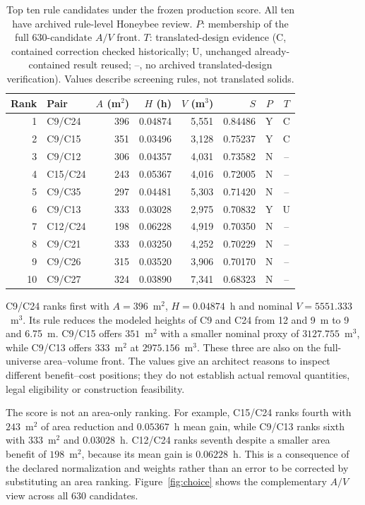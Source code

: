 \documentclass{llncs}
\begin{document}
\begin{table}[tbp]
\caption{Top ten rule candidates under the frozen production score. All ten have archived rule-level Honeybee review. $P$: membership of the full 630-candidate $A/V$ front. $T$: translated-design evidence (C, contained correction checked historically; U, unchanged already-contained result reused; --, no archived translated-design verification). Values describe screening rules, not translated solids.}
\label{tab:topten}\centering\small
\setlength{\tabcolsep}{3.2pt}
\begin{tabular}{rlrrrrcc}\toprule
Rank & Pair & $A$ (m$^2$) & $H$ (h) & $V$ (m$^3$) & $S$ & $P$ & $T$\\\midrule
1 & C9/C24 & 396 & 0.04874 & 5,551 & 0.84486 & Y & C\\
2 & C9/C15 & 351 & 0.03496 & 3,128 & 0.75237 & Y & C\\
3 & C9/C12 & 306 & 0.04357 & 4,031 & 0.73582 & N & --\\
4 & C15/C24 & 243 & 0.05367 & 4,016 & 0.72005 & N & --\\
5 & C9/C35 & 297 & 0.04481 & 5,303 & 0.71420 & N & --\\
6 & C9/C13 & 333 & 0.03028 & 2,975 & 0.70832 & Y & U\\
7 & C12/C24 & 198 & 0.06228 & 4,919 & 0.70350 & N & --\\
8 & C9/C21 & 333 & 0.03250 & 4,252 & 0.70229 & N & --\\
9 & C9/C26 & 315 & 0.03520 & 3,906 & 0.70170 & N & --\\
10 & C9/C27 & 324 & 0.03890 & 7,341 & 0.68323 & N & --\\
\bottomrule\end{tabular}
\end{table}

C9/C24 ranks first with $A=396$~m$^2$, $H=0.04874$~h and nominal $V=5551.333$~m$^3$. Its rule reduces the modeled heights of C9 and C24 from 12 and 9~m to 9 and 6.75~m. C9/C15 offers $351$~m$^2$ with a smaller nominal proxy of $3127.755$~m$^3$, while C9/C13 offers $333$~m$^2$ at $2975.156$~m$^3$. These three are also on the full-universe area--volume front. The values give an architect reasons to inspect different benefit--cost positions; they do not establish actual removal quantities, legal eligibility or construction feasibility.

The score is not an area-only ranking. For example, C15/C24 ranks fourth with $243$~m$^2$ of area reduction and $0.05367$~h mean gain, while C9/C13 ranks sixth with $333$~m$^2$ and $0.03028$~h. C12/C24 ranks seventh despite a smaller area benefit of $198$~m$^2$, because its mean gain is $0.06228$~h. This is a consequence of the declared normalization and weights rather than an error to be corrected by substituting an area ranking. Figure~\ref{fig:choice} shows the complementary $A/V$ view across all 630 candidates.
\end{document}
